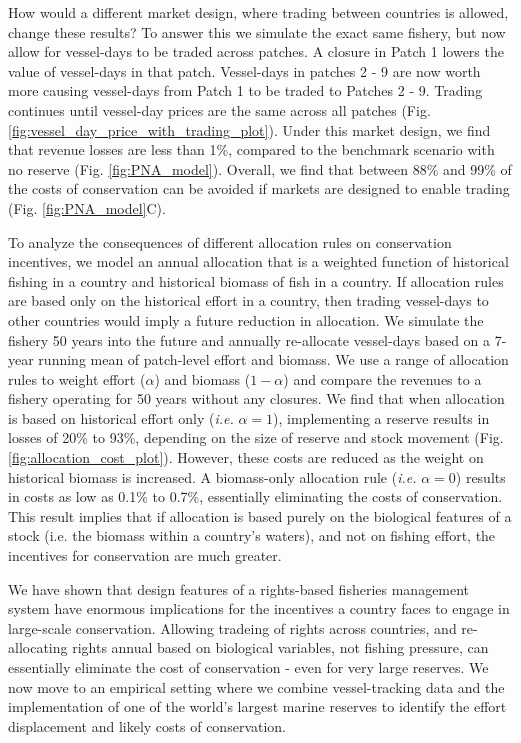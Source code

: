 \documentclass[12pt]{article}
\begin{document}
How would a different market design, where trading between countries is allowed, change these results? To answer this we simulate the exact same fishery, but now allow for vessel-days to be traded across patches. A closure in Patch 1 lowers the value of vessel-days in that patch. Vessel-days in patches 2 - 9 are now worth more causing vessel-days from Patch 1 to be traded to Patches 2 - 9. Trading continues until vessel-day prices are the same across all patches (Fig. \ref{fig:vessel_day_price_with_trading_plot}). Under this market design, we find that revenue losses are less than 1\%, compared to the benchmark scenario with no reserve (Fig. \ref{fig:PNA_model}). Overall, we find that between 88\% and 99\% of the costs of conservation can be avoided if markets are designed to enable trading (Fig. \ref{fig:PNA_model}C).

To analyze the consequences of different allocation rules on conservation incentives, we model an annual allocation that is a weighted function of historical fishing in a country and historical biomass of fish in a country. If allocation rules are based only on the historical effort in a country, then trading vessel-days to other countries would imply a future reduction in allocation. We simulate the fishery 50 years into the future and annually re-allocate vessel-days based on a 7-year running mean of patch-level effort and biomass. We use a range of allocation rules to weight effort ($\alpha$) and biomass ($1 - \alpha$) and compare the revenues to a fishery operating for 50 years without any closures. We find that when allocation is based on historical effort only (\emph{i.e.} $\alpha = 1$), implementing a reserve results in losses of 20\% to 93\%, depending on the size of reserve and stock movement (Fig. \ref{fig:allocation_cost_plot}). However, these costs are reduced as the weight on historical biomass is increased. A biomass-only allocation rule (\emph{i.e.} $\alpha = 0$) results in costs as low as 0.1\% to 0.7\%, essentially eliminating the costs of conservation. This result implies that if allocation is based purely on the biological features of a stock (i.e. the biomass within a country's waters), and not on fishing effort, the incentives for conservation are much greater.

We have shown that design features of a rights-based fisheries management system have enormous implications for the incentives a country faces to engage in large-scale conservation. Allowing tradeing of rights across countries, and re-allocating rights annual based on biological variables, not fishing pressure, can essentially eliminate the cost of conservation - even for very large reserves. We now move to an empirical setting where we combine vessel-tracking data and the implementation of one of the world's largest marine reserves to identify the effort displacement and likely costs of conservation. 
\end{document}
